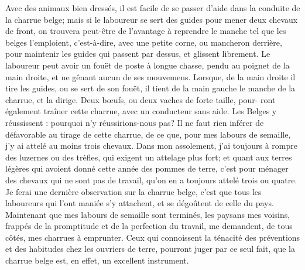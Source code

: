 Avec des animaux bien dressés, il est facile de se passer d'aide dans la conduite de la charrue belge; mais si le laboureur se sert des guides pour mener deux chevaux de front, on trouvera peut-être de l'avantage à reprendre le manche tel que les belges l'emploient, c'est-à-dire, avec une petite corne, ou mancheron derrière, pour maintenir les guides qui passent par dessus, et glissent librement. Le laboureur peut avoir un fouët de poste à longue chasse, pendu au poignet de la main droite, et ne gênant aucun de ses mouvemens. Lorsque, de la main droite il tire les guides, ou se sert de son fouët, il tient de la main gauche le manche de la charrue, et la dirige. Deux bœufs, ou deux vaches de forte taille, pour-\setcounter{page}{410} ront également traîner cette charrue, avec un conducteur sans aide. Les Belges y réussissent : pourquoi n’y réussirions-nous pas? Il ne faut rien inférer de défavorable au tirage de cette charrue, de ce que, pour mes labours de semaille, j’y ai attelé au moins trois chevaux. Dans mon assolement, j’ai toujours à rompre des luzernes ou des trèfles, qui exigent un attelage plus fort; et quant aux terres légères qui avoient donné cette année des pommes de terre, c’est pour ménager des chevaux qui ne sont pas de travail, qu’on en a toujours attelé trois ou quatre.
Je ferai une dernière observation sur la charrue belge, c’est que tous les laboureurs qui l’ont maniée s’y attachent, et se dégoûtent de celle du pays. Maintenant que mes labours de semaille sont terminés, les paysans mes voisins, frappés de la promptitude et de la perfection du travail, me demandent, de tous côtés, mes charrues à emprunter. Ceux qui connoissent la ténacité des préventions et des habitudes chez les ouvriers de terre, pourront juger par ce seul fait, que la charrue belge est, en effet, un excellent instrument.